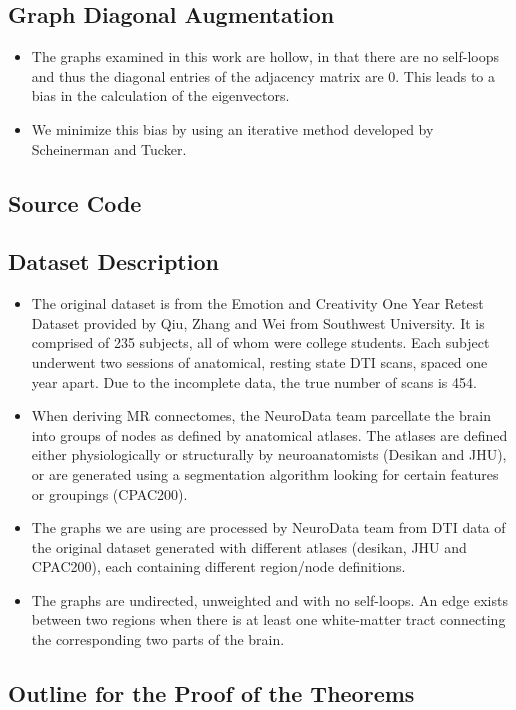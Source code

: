 \documentclass[a4paper]{article}
\begin{document}
\subsection{Graph Diagonal Augmentation}
\begin{itemize}
\item The graphs examined in this work are hollow, in that there are no self-loops and thus the diagonal entries of the adjacency matrix are 0. This leads to a bias in the calculation of the eigenvectors.
\item We minimize this bias by using an iterative method developed by Scheinerman and Tucker.
\end{itemize}

\subsection{Source Code}

\subsection{Dataset Description}
\begin{itemize}
\item The original dataset is from the Emotion and Creativity One Year Retest Dataset provided by Qiu, Zhang and Wei from Southwest University. It is comprised of 235 subjects, all of whom were college students. Each subject underwent two sessions of anatomical, resting state DTI scans, spaced one year apart. Due to the incomplete data, the true number of scans is 454.
\item When deriving MR connectomes, the NeuroData team parcellate the brain into groups of nodes as defined by anatomical atlases. The atlases are defined either physiologically or structurally by neuroanatomists (Desikan and JHU), or are generated using a segmentation algorithm looking for certain features or groupings (CPAC200).
\item The graphs we are using are processed by NeuroData team from DTI data of the original dataset generated with different atlases (desikan, JHU and CPAC200), each containing different region/node definitions.
\item The graphs are undirected, unweighted and with no self-loops. An edge exists between two regions when there is at least one white-matter tract connecting the corresponding two parts of the brain.
\end{itemize}

\subsection{Outline for the Proof of the Theorems}
\end{document}
